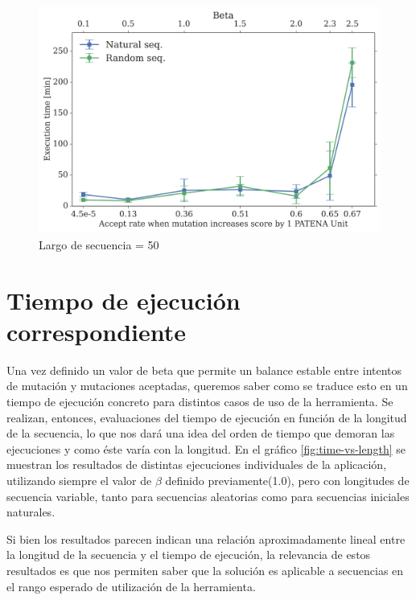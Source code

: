 \begin{figure}[htbp]
\advance\leftskip-1.2cm
\includegraphics[width=1.1\textwidth]{img/resultados/beta-vs-time-length50-300dpi.png}
\caption{Largo de secuencia = 50}
\label{fig:beta-vs-time}
\end{figure}



\section{Tiempo de ejecución correspondiente}

Una vez definido un valor de beta que permite un balance estable entre intentos de mutación y mutaciones aceptadas, queremos saber como se traduce esto en un tiempo de ejecución concreto para distintos casos de uso de la herramienta.
Se realizan, entonces, evaluaciones del tiempo de ejecución en función de la longitud de la secuencia, lo que nos dará una idea del orden de tiempo que demoran las ejecuciones y como éste varía con la longitud.
En el gráfico \ref{fig:time-vs-length} se muestran los resultados de distintas ejecuciones individuales de la aplicación, utilizando siempre el valor de $\beta$ definido previamente(1.0), pero con longitudes de secuencia variable, 
tanto para secuencias aleatorias como para secuencias iniciales naturales.

Si bien los resultados parecen indican una relación aproximadamente lineal entre la longitud de la secuencia y el tiempo de ejecución, la relevancia de estos resultados es que nos permiten 
saber que la solución es aplicable a secuencias en el rango esperado de utilización de la herramienta. 

